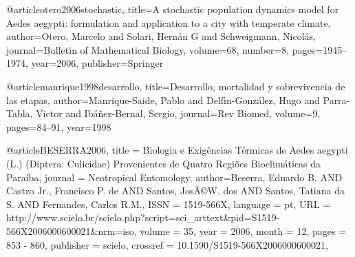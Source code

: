 @article{otero2006stochastic,
  title={A stochastic population dynamics model for Aedes aegypti: formulation and application to a city with temperate climate},
  author={{Otero}, {Marcelo and Solari, Hern{\'a}n G and Schweigmann, Nicol{\'a}s}},
  journal={Bulletin of Mathematical Biology},
  volume={68},
  number={8},
  pages={1945--1974},
  year={2006},
  publisher={Springer}
}


@article{manrique1998desarrollo,
  title={Desarrollo, mortalidad y sobrevivencia de las etapas},
  author={Manrique-Saide, Pablo and Delf{\'\i}n-Gonz{\'a}lez, Hugo and Parra-Tabla, Victor and Ib{\'a}{\~n}ez-Bernal, Sergio},
  journal={Rev Biomed},
  volume={9},
  pages={84--91},
  year={1998}
}

@article{BESERRA2006,
   title = {{Biologia e Exigências Térmicas de Aedes aegypti (L.) (Diptera: Culicidae)
Provenientes de Quatro Regiões Bioclimáticas da Paraíba}},
   journal = {{Neotropical Entomology}},
   author={Beserra, Eduardo B. AND Castro Jr., Francisco P. de AND Santos, Jos\~A\copyright W. dos AND Santos, Tatiana da S. AND Fernandes, Carlos R.M.},
   ISSN = {1519-566X},
   language = {pt},
   URL = {http://www.scielo.br/scielo.php?script=sci_arttext&pid=S1519-566X2006000600021&nrm=iso},
   volume = {35},
   year = {2006},
   month = {12},
   pages = {853 - 860},
   publisher = {scielo},
   crossref = {10.1590/S1519-566X2006000600021},
   }
